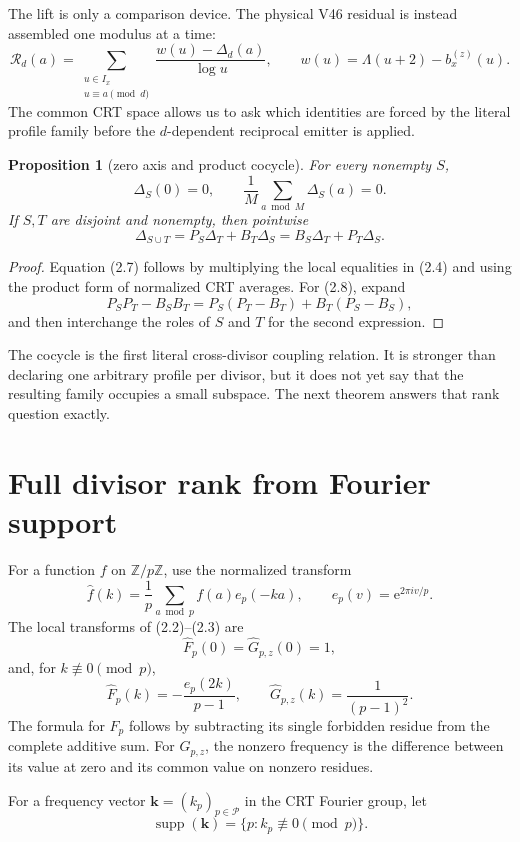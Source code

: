 \documentclass[11pt]{article}
\newtheorem{proposition}[theorem]{Proposition}
\newcommand{\Z}{\mathbb Z}
\newcommand{\e}{\mathrm e}
\newcommand{\DeltaP}{\Delta}
\begin{document}
The lift is only a comparison device.  The physical V46 residual is instead
assembled one modulus at a time:
\[
 \mathcal R_d(a)=
 \sum_{\substack{u\in I_x\\u\equiv a\pmod d}}
 \frac{w(u)-\DeltaP_d(a)}{\log u},
 \qquad
 w(u)=\Lambda(u+2)-b_x^{(z)}(u).
 \tag{2.6}
\]
The common CRT space allows us to ask which identities are forced by the
literal profile family before the $d$-dependent reciprocal emitter is applied.

\begin{proposition}[zero axis and product cocycle]
\label{prop:cocycle}
For every nonempty $S$,
\[
 \DeltaP_S(0)=0,\qquad
 \frac1M\sum_{a\bmod M}\DeltaP_S(a)=0.
 \tag{2.7}
\]
If $S,T$ are disjoint and nonempty, then pointwise
\[
 \DeltaP_{S\cup T}
 =P_S\DeltaP_T+B_T\DeltaP_S
 =B_S\DeltaP_T+P_T\DeltaP_S.
 \tag{2.8}
\]
\end{proposition}

\begin{proof}
Equation (2.7) follows by multiplying the local equalities in (2.4) and
using the product form of normalized CRT averages.  For (2.8), expand
\[
 P_SP_T-B_SB_T=P_S(P_T-B_T)+B_T(P_S-B_S),
\]
and then interchange the roles of $S$ and $T$ for the second expression.
\end{proof}

The cocycle is the first literal cross-divisor coupling relation.  It is
stronger than declaring one arbitrary profile per divisor, but it does not yet
say that the resulting family occupies a small subspace.  The next theorem
answers that rank question exactly.

\section{Full divisor rank from Fourier support}

For a function $f$ on $\Z/p\Z$, use the normalized transform
\[
 \widehat f(k)=\frac1p\sum_{a\bmod p}f(a)e_p(-ka),
 \qquad e_p(v)=\e^{2\pi i v/p}.
 \tag{3.1}
\]
The local transforms of (2.2)--(2.3) are
\[
 \widehat F_p(0)=\widehat G_{p,z}(0)=1,
 \tag{3.2}
\]
and, for $k\not\equiv0\pmod p$,
\[
 \widehat F_p(k)=-\frac{e_p(2k)}{p-1},\qquad
 \widehat G_{p,z}(k)=\frac1{(p-1)^2}.
 \tag{3.3}
\]
The formula for $F_p$ follows by subtracting its single forbidden residue
from the complete additive sum.  For $G_{p,z}$, the nonzero frequency is the
difference between its value at zero and its common value on nonzero residues.

For a frequency vector $\boldsymbol k=(k_p)_{p\in\mathcal P}$ in the CRT
Fourier group, let
\[
 \operatorname{supp}(\boldsymbol k)=\{p:k_p\not\equiv0\pmod p\}.
\]
\end{document}
